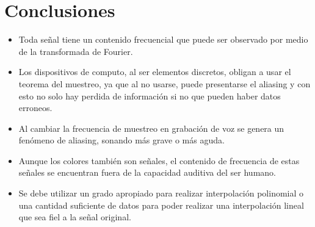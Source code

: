 \documentclass[comsoc, journal]{IEEEtran}
\begin{document}
\section{Conclusiones}
\begin{itemize}
    \item Toda señal tiene un contenido frecuencial que puede ser observado por medio de la transformada de Fourier.
    \item Los dispositivos de computo, al ser elementos discretos, obligan a usar el teorema del muestreo, ya que al no usarse, puede presentarse el aliasing y con esto no solo hay perdida de información si no que pueden haber datos erroneos.
    \item Al cambiar la frecuencia de muestreo en grabación de voz se genera un fenómeno de aliasing, sonando más grave o más aguda.
    \item Aunque los colores también son señales, el contenido de frecuencia de estas señales se encuentran fuera de la capacidad auditiva del ser humano.
    \item Se debe utilizar un grado apropiado para realizar interpolación polinomial o una cantidad suficiente de datos para poder realizar una interpolación lineal que sea fiel a la señal original.
\end{itemize}

\ifCLASSOPTIONcaptionsoff
  \newpage
\fi
\end{document}
